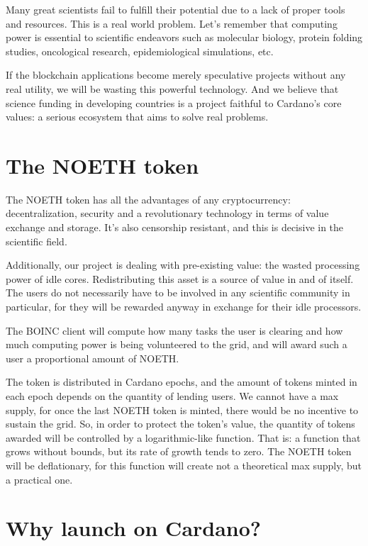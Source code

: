 \documentclass[11pt]{amsart}
\numberwithin{equation}{section}
\theoremstyle{definition}
\theoremstyle{remark}
\renewcommand{\_}[1]{_{\left( #1 \right)}}
\renewcommand{\^}[1]{^{\left( #1 \right)}}
\begin{document}
Many great scientists fail to fulfill their potential due to a lack of proper tools and resources. This is a real world problem. Let's remember that computing power is essential to scientific endeavors such as molecular biology, protein folding studies, oncological research, epidemiological simulations, etc.

If the blockchain applications become merely speculative projects without any real utility, we will be wasting this powerful technology. And we believe that science funding in developing countries is a project faithful to Cardano's core values: a serious ecosystem that aims to solve real problems.

\section{The NOETH token}

The NOETH token has all the advantages of any cryptocurrency: decentralization, security and a revolutionary technology in terms of value exchange and storage. It's also censorship resistant, and this is decisive in the scientific field.

Additionally, our project is dealing with pre-existing value: the wasted processing power of idle cores. Redistributing this asset is a source of value in and of itself. The users do not necessarily have to be involved in any scientific community in particular, for they will be rewarded anyway in exchange for their idle processors.

The BOINC client will compute how many tasks the user is clearing and how much computing power is being volunteered to the grid, and will award such a user a proportional amount of NOETH.

The token is distributed in Cardano epochs, and the amount of tokens minted in each epoch depends on the quantity of lending users.
We cannot have a max supply, for once the last NOETH token is minted, there would be no incentive to sustain the grid. So, in order to protect the token's value, the quantity of tokens awarded will be controlled by a logarithmic-like function. That is: a function that grows without bounds, but its rate of growth tends to zero. The NOETH token will be deflationary, for this function will create not a theoretical max supply, but a practical one.

\section{Why launch on Cardano?}
\end{document}
